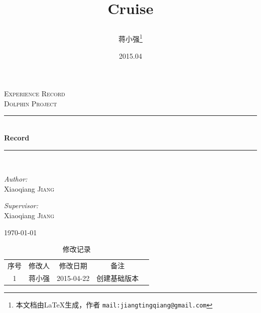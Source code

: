 \documentclass{book}
\begin{document}
\begin{titlepage}
\begin{center}

\textsc{\LARGE Experience Record}\\[1.5cm]

\textsc{Dolphin Project}\\[0.5cm]

\rule{8cm}{0.2em}\mbox{} \\[0.4cm]

{\huge \bfseries Record}\\[0.4cm]

\rule{8cm}{0.2em}\mbox{} \\[1.5cm]

\begin{minipage}{0.4\textwidth}
\begin{flushleft} \large
\emph{Author:}\\
Xiaoqiang \textsc{Jiang}
\end{flushleft}
\end{minipage}

\begin{minipage}{0.4\textwidth}
\begin{flushright} \large
\emph{Supervisor:} \\
Xiaoqiang \textsc{Jiang}
\end{flushright}
\end{minipage}

\vfill

{\large \today}

\end{center}
\end{titlepage}

\title{\Huge{Cruise}		
\author{蒋小强\footnote{本文档由\LaTeX{}生成，作者
\texttt{mail:jiangtingqiang@gmail.com}
}}}

\date{2015.04}	

\maketitle %
\clearpage
\mbox{}         
\clearpage

\begin{table}\caption[Caption for LOF]{修改记录\protect\footnotemark}					
	\medskip
	\centering		
	\begin{tabular}{|c|c|c|c|c|}
		\hline
		\multirow{1}{*}{序号}
		& \multicolumn{1}{c|}{修改人}  
		& \multicolumn{1}{c|}{修改日期} 
		& \multicolumn{1}{c|}{备注}\\			
		\cline{1-4}
		1 & 蒋小强 & 2015-04-22 & 创建基础版本\\
		\hline	
	\end{tabular}
\end{table}
\end{document}
